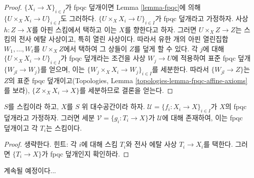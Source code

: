 \begin{proof}
$\{X_i \to X\}_{i \in I}$가 fpqc 덮개이면 Lemma \ref{lemma-fpqc}에 의해
$\{U \times_X X_i \to U\}_{i \in I}$도 그러하다.
$\{U \times_X X_i \to U\}_{i \in I}$가 fpqc 덮개라고 가정하자. 사상
$h : Z \to X$를 아핀 스킴에서 택하고 이는 $X$를 향한다고 하자. 그러면
$U \times_X Z \to Z$는 스킴의 전사 에탈 사상이고, 특히 열린 사상이다.
따라서 유한 개의 아핀 열린집합 $W_1, \ldots, W_t$를
$U \times_X Z$에서 택하여 그 상들이 $Z$를 덮게 할 수 있다. 각 $j$에
대해 $\{U \times_X X_i \to U\}_{i \in I}$가 fpqc 덮개라는 조건을 사상
$W_j \to U$에 적용하여 표준 fpqc 덮개 $\{W_{jl} \to W_j\}$를 얻으며,
이는 $\{W_j \times_X X_i \to W_j\}_{i \in I}$를 세분한다. 따라서
$\{W_{jl} \to Z\}$는 $Z$의 표준 fpqc 덮개이고(Topologies, Lemma
\ref{topologies-lemma-fpqc-affine-axioms}를 보라),
$\{Z \times_X X_i \to X\}$를 세분하므로 결론을 얻는다.
\end{proof}

\begin{lemma}
\label{lemma-refine-fpqc-schemes}
$S$를 스킴이라 하고, $X$를 $S$ 위 대수공간이라 하자.
$\mathcal{U} = \{f_i : X_i \to X\}_{i \in I}$가 $X$의 fpqc 덮개라고
가정하자. 그러면 세분 $\mathcal{V} = \{g_i : T_i \to X\}$가
$\mathcal{U}$에 대해 존재하여, 이는 fpqc 덮개이고 각 $T_i$는 스킴이다.
\end{lemma}

\begin{proof}
생략한다. 힌트: 각 $i$에 대해 스킴 $T_i$와 전사 에탈 사상
$T_i \to X_i$를 택한다. 그러면 $\{T_i \to X\}$가 fpqc 덮개인지 확인하라.
\end{proof}

\noindent
계속될 예정이다...













